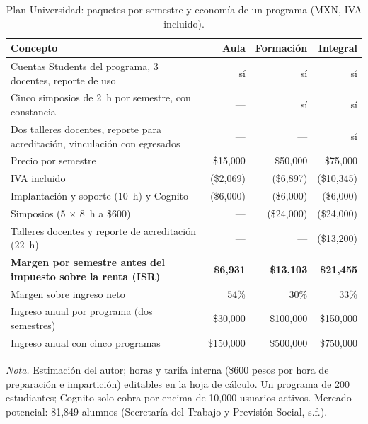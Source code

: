 \documentclass[12pt, a4paper]{article}
\begin{document}
\begin{table}[!htbp]
  \centering
  \caption{Plan Universidad: paquetes por semestre y economía de un programa
  (MXN, IVA incluido).}
  \label{tab:universidad}
  \footnotesize
  \begin{tabularx}{\textwidth}{X r r r}
    \toprule
    \textbf{Concepto} & \textbf{Aula} & \textbf{Formación} & \textbf{Integral} \\
    \midrule
    Cuentas Students del programa, 3 docentes, reporte de uso & sí & sí & sí \\
    Cinco simposios de 2~h por semestre, con constancia & --- & sí & sí \\
    Dos talleres docentes, reporte para acreditación, vinculación con egresados & --- & --- & sí \\
    \midrule
    Precio por semestre & \$15,000 & \$50,000 & \$75,000 \\
    IVA incluido & (\$2,069) & (\$6,897) & (\$10,345) \\
    Implantación y soporte (10~h) y Cognito & (\$6,000) & (\$6,000) & (\$6,000) \\
    Simposios (5 $\times$ 8~h a \$600) & --- & (\$24,000) & (\$24,000) \\
    Talleres docentes y reporte de acreditación (22~h) & --- & --- & (\$13,200) \\
    \textbf{Margen por semestre antes del impuesto sobre la renta (ISR)} & \textbf{\$6,931} & \textbf{\$13,103} & \textbf{\$21,455} \\
    Margen sobre ingreso neto & 54\% & 30\% & 33\% \\
    \midrule
    Ingreso anual por programa (dos semestres) & \$30,000 & \$100,000 & \$150,000 \\
    Ingreso anual con cinco programas & \$150,000 & \$500,000 & \$750,000 \\
    \bottomrule
  \end{tabularx}
  \begin{flushleft}
    \small\textit{Nota.} Estimación del autor; horas y tarifa interna
    (\$600 pesos por hora de preparación e impartición) editables en la hoja
    de cálculo. Un programa de 200 estudiantes; Cognito solo cobra por
    encima de 10,000 usuarios activos. Mercado potencial: 81,849 alumnos
    (Secretaría del Trabajo y Previsión Social, s.f.).
  \end{flushleft}
\end{table}
\end{document}
